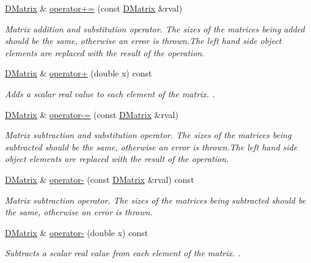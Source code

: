 \begin{DoxyCompactItemize}
\hyperlink{classDMatrix}{DMatrix} \& \hyperlink{classDMatrix_add9bb19634bb522c9e877491094e738c}{operator+=} (const \hyperlink{classDMatrix}{DMatrix} \&rval)
\begin{DoxyCompactList}\small\item\em Matrix addition and substitution operator. The sizes of the matrices being added should be the same, otherwise an error is thrown.The left hand side object elements are replaced with the result of the operation. \item\end{DoxyCompactList}\item 
\hyperlink{classDMatrix}{DMatrix} \& \hyperlink{classDMatrix_a666ade216863c56a4c349bb8fee0b972}{operator+} (double x) const 
\begin{DoxyCompactList}\small\item\em Adds a scalar real value to each element of the matrix. . \item\end{DoxyCompactList}\item 
\hyperlink{classDMatrix}{DMatrix} \& \hyperlink{classDMatrix_a9535ca71463a4e2f687b680569c9dd75}{operator-\/=} (const \hyperlink{classDMatrix}{DMatrix} \&rval)
\begin{DoxyCompactList}\small\item\em Matrix subtraction and substitution operator. The sizes of the matrices being subtracted should be the same, otherwise an error is thrown.The left hand side object elements are replaced with the result of the operation. \item\end{DoxyCompactList}\item 
\hyperlink{classDMatrix}{DMatrix} \& \hyperlink{classDMatrix_adf28e5ff346309620d9dded905cf5b22}{operator-\/} (const \hyperlink{classDMatrix}{DMatrix} \&rval) const 
\begin{DoxyCompactList}\small\item\em Matrix subtraction operator. The sizes of the matrices being subtracted should be the same, otherwise an error is thrown. \item\end{DoxyCompactList}\item 
\hyperlink{classDMatrix}{DMatrix} \& \hyperlink{classDMatrix_ac0a611dd59097d0a3920abf376d054e7}{operator-\/} (double x) const 
\begin{DoxyCompactList}\small\item\em Subtracts a scalar real value from each element of the matrix. . \item\end{DoxyCompactList}\item 

\end{DoxyCompactItemize}
